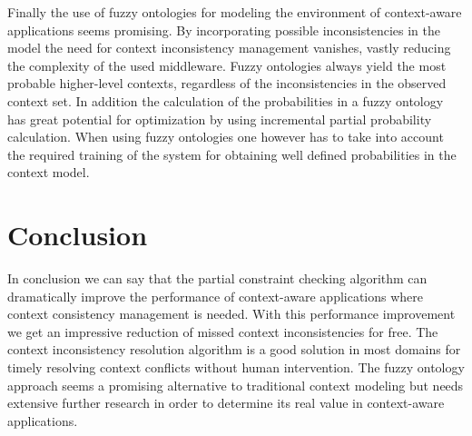 \documentclass[journal]{vgtc}                %
\begin{document}
Finally the use of fuzzy ontologies for modeling the environment of context-aware applications seems promising. By incorporating possible inconsistencies in the model the need for context inconsistency management vanishes, vastly reducing the complexity of the used middleware. Fuzzy ontologies always yield the most probable higher-level contexts, regardless of the inconsistencies in the observed context set. In addition the calculation of the probabilities in a fuzzy ontology has great potential for optimization by using incremental partial probability calculation. 
When using fuzzy ontologies one however has to take into account the required training of the system for obtaining well defined probabilities in the context model. 

\section{Conclusion}
In conclusion we can say that the partial constraint checking algorithm can dramatically improve the performance of context-aware applications where context consistency management is needed. With this performance improvement we get an impressive reduction of missed context inconsistencies for free. The context inconsistency resolution algorithm is a good solution in most domains for timely resolving context conflicts without human intervention. The fuzzy ontology approach seems a promising alternative to traditional context modeling but needs extensive further research in order to determine its real value in context-aware applications.




\appendix
\end{document}
